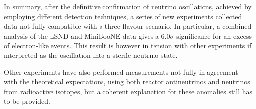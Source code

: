 \vspace{1em}

In summary, after the definitive confirmation of neutrino oscillations, achieved by employing different detection techniques, a series of new experiments collected data not fully compatible with a three-flavour scenario. In particular, a combined analysis of the LSND and MiniBooNE data gives a $6.0\sigma$ significance for an excess of electron-like events. This result is however in tension with other experiments if interpreted as the oscillation into a sterile neutrino state. 

Other experiments have also performed measurements not fully in agreement with the theoretical expectations, using both reactor antineutrinos and neutrinos from radioactive isotopes, but a coherent explanation for these anomalies still has to be provided. 